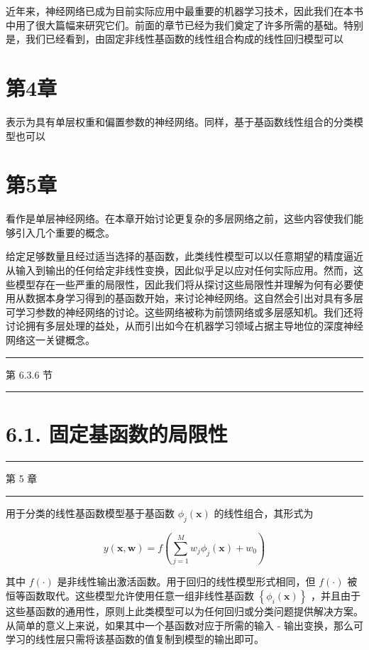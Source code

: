 \documentclass[10pt]{article}
\newcommand{\HRule}{\begin{center}\rule{0.9\linewidth}{0.2mm}\end{center}}
\begin{document}
近年来，神经网络已成为目前实际应用中最重要的机器学习技术，因此我们在本书中用了很大篇幅来研究它们。前面的章节已经为我们奠定了许多所需的基础。特别是，我们已经看到，由固定非线性基函数的线性组合构成的线性回归模型可以

\section*{第4章}

表示为具有单层权重和偏置参数的神经网络。同样，基于基函数线性组合的分类模型也可以

\section*{第5章}

看作是单层神经网络。在本章开始讨论更复杂的多层网络之前，这些内容使我们能够引入几个重要的概念。

给定足够数量且经过适当选择的基函数，此类线性模型可以以任意期望的精度逼近从输入到输出的任何给定非线性变换，因此似乎足以应对任何实际应用。然而，这些模型存在一些严重的局限性，因此我们将从探讨这些局限性并理解为何有必要使用从数据本身学习得到的基函数开始，来讨论神经网络。这自然会引出对具有多层可学习参数的神经网络的讨论。这些网络被称为前馈网络或多层感知机。我们还将讨论拥有多层处理的益处，从而引出如今在机器学习领域占据主导地位的深度神经网络这一关键概念。

\HRule

第 6.3.6 节

\HRule

\section*{6.1. 固定基函数的局限性}

\HRule

第 5 章

\HRule

用于分类的线性基函数模型基于基函数 \({\phi }_{j}\left( \mathbf{x}\right)\) 的线性组合，其形式为

\[
y\left( {\mathbf{x},\mathbf{w}}\right)  = f\left( {\mathop{\sum }\limits_{{j = 1}}^{M}{w}_{j}{\phi }_{j}\left( \mathbf{x}\right)  + {w}_{0}}\right)  \tag{6.1}
\]

其中 \(f\left( \cdot \right)\) 是非线性输出激活函数。用于回归的线性模型形式相同，但 \(f\left( \cdot \right)\) 被恒等函数取代。这些模型允许使用任意一组非线性基函数 \(\left\{  {{\phi }_{i}\left( \mathbf{x}\right) }\right\}\) ，并且由于这些基函数的通用性，原则上此类模型可以为任何回归或分类问题提供解决方案。从简单的意义上来说，如果其中一个基函数对应于所需的输入 - 输出变换，那么可学习的线性层只需将该基函数的值复制到模型的输出即可。
\end{document}
